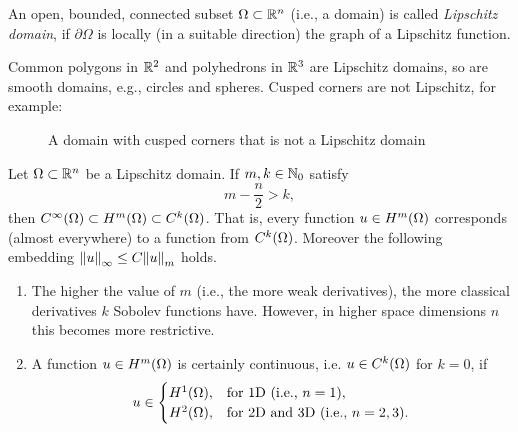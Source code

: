 \begin{definition}
	An open, bounded, connected subset \(\Omega \subset \mathbb{R}^n\) (i.e., a domain) is called \emph{Lipschitz domain}, if \(\partial\Omega\) is locally (in a suitable direction) the graph of a Lipschitz function.
\end{definition}

\begin{example}
	Common polygons in \(\mathbb{R}^2\) and polyhedrons in \(\mathbb{R}^3\) are Lipschitz domains, so are smooth domains, e.g., circles and spheres.
	Cusped corners are not Lipschitz, for example:
	\begin{figure}[h]
		\centering
		\caption{A domain with cusped corners that is not a Lipschitz domain}
		\label{fig:2-1}
	\end{figure}
\end{example}

\begin{theorem}\label{theorem:2-12}
	Let \(\Omega \subset \mathbb{R}^n\) be a Lipschitz domain.
	If \(m, k \in \mathbb{N}_0\) satisfy
	\[
		m - \frac{n}{2} > k,
	\]
	then \(C^\infty\parentheses*{\Omega} \subset H^m\parentheses*{\Omega} \subset C^k\parentheses*{\Omega}\).
	That is, every function \(u \in H^m\parentheses*{\Omega}\) corresponds (almost everywhere) to a function from \(C^k\parentheses*{\Omega}\).
	Moreover the following embedding \(\norm*{u}_\infty \le C\norm*{u}_m\) holds.
\end{theorem}

\begin{remark}
	\begin{enumerate}
		\item The higher the value of \(m\) (i.e., the more weak derivatives), the more classical derivatives \(k\) Sobolev functions have.
		However, in higher space dimensions \(n\) this becomes more restrictive.
		\item A function \(u \in H^m\parentheses*{\Omega}\) is certainly continuous, i.e. \(u \in C^k\parentheses*{\Omega}\) for \(k = 0\), if
		\[
			u \in \begin{cases}
				H^1\parentheses*{\Omega}, & \text{for 1D (i.e., }n = 1\text{)},\\
				H^2\parentheses*{\Omega}, & \text{for 2D and 3D (i.e., }n = 2, 3\text{)}.
			\end{cases}
		\]
	\end{enumerate}
\end{remark}


